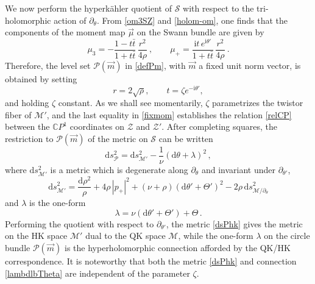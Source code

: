 \documentclass[12pt,reqno]{article}
\numberwithin{equation}{section}
\newcommand{\be}{\begin{equation}}
\newcommand{\ee}{\end{equation}}
\def\({\left(}
\def\){\right)}
\newcommand{\CP}{\IC P^1}
\newcommand{\de}{\mathrm{d}}
\newcommand{\I}{\mathrm{i}}
\newcommand{\cS}{\mathcal{S}}
\newcommand{\cM}{\mathcal{M}}
\newcommand{\cP}{\mathcal{P}}
\newcommand{\cZ}{\mathcal{Z}}
\newcommand{\IC}{\mathbb{C}}
\def\pa{\partial}
\newcommand{\hk}{{hyperk\"ahler}\xspace}
\def\varpiqk{t}
\def\varpihk{\zeta}
\def\sigp{{\theta}}
\def\phip{{\theta'}}
\def\pTheta{\Theta'}
\def\pcM{\cM'}
\def\pcZ{\cZ'}
\def\cfff{\nu} %
\def\conhyper{\lambda}
\numberwithin{equation}{section}
\begin{document}
We now perform the \hk quotient of $\cS$ with respect to the tri-holomorphic
action of  $\pa_\sigp$. From \eqref{om3SZ} and \eqref{holom-om},
one finds that the components of the moment map $\vec \mu$ on the Swann bundle
are given by
\be
\mu_3=-\frac{1-\varpiqk\bar\varpiqk}{1+\varpiqk\bar\varpiqk}\,\frac{r^2}{4\rho}\ ,
\qquad
\mu_+=\frac{\I\varpiqk\, e^{\I\phip}}{1+\varpiqk\bar\varpiqk}\,\frac{r^2 }{4\rho}\ .
\ee
Therefore, the level set $\cP(\vec m)$ in \eqref{defPm}, with $\vec m$ a fixed
unit norm vector, is obtained by setting
\be
r=2\sqrt{\rho},
\qquad
t=\zeta e^{-\I\phip},
\label{fixmom}
\ee
and holding $\varpihk$ constant. As we shall see momentarily, $\varpihk$
parametrizes the twistor fiber of $\pcM$, and the last equality in \eqref{fixmom}
establishes the relation \eqref{relCP} between
the $\CP$ coordinates on $\cZ$ and $\pcZ$.
After completing squares, the restriction to $\cP(\vec m)$ of the metric on $\cS$
can be written
\be
\label{metricP}
\de s^2_{\cP}=\de s^2_{\pcM} - \frac1{\cfff} \left(
\de\sigp+\conhyper \right)^2\, ,
\ee
where $\de s^2_{\pcM}$ is a metric which is degenerate along $\pa_\sigp$ and
invariant under $\pa_\phip$,
\be
\label{dsPhk}
\de s^2_{\pcM} =\frac{\de\rho^2}{\rho} + 4 \rho \, |p_+|^2   +
(\cfff+\rho) \(\de\phip+\pTheta\)^2 -2\rho \, \de s^2_{\cM/\pa_\sigp}
\ee
and $\conhyper$ is the one-form
\be
\conhyper =\cfff \( \de\phip+\pTheta\) + \Theta\, .
\label{lambdlbTheta}
\ee
Performing the quotient with respect to $\pa_\phip$, the metric \eqref{dsPhk}
gives the metric on the HK space $\pcM$ dual to the QK space $\cM$,
while the one-form $\conhyper$ on the circle bundle $\cP(\vec m)$
is  the hyperholomorphic connection afforded by the QK/HK correspondence.
It is noteworthy that both the metric \eqref{dsPhk} and connection \eqref{lambdlbTheta}
are independent of the parameter $\varpihk$.
\end{document}

